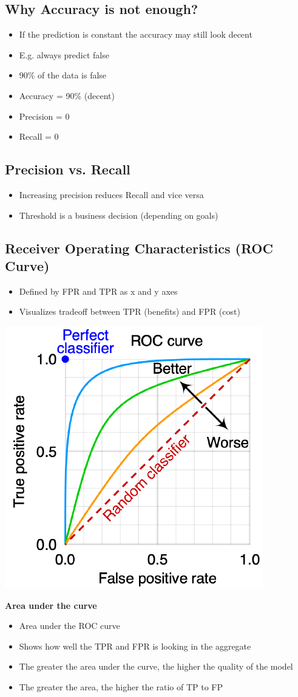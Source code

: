 \subsection{Why Accuracy is not enough?}
\begin{itemize}
    \item If the prediction is constant the accuracy may still look decent
    \item E.g. always predict false
    \item 90\% of the data is false
    \item Accuracy = 90\% (decent)
    \item Precision = 0
    \item Recall = 0
\end{itemize}

\subsection{Precision vs. Recall}
\begin{itemize}
    \item Increasing precision reduces Recall and vice versa
    \item Threshold is a business decision (depending on goals)
\end{itemize}

\subsection{Receiver Operating Characteristics (ROC Curve)}
\begin{itemize}
    \item Defined by FPR and TPR as x and y axes
    \item Visualizes tradeoff between TPR (benefits) and FPR (cost)
\end{itemize}
\begin{center}
    \includegraphics[width=0.4\linewidth]{./img/roc.png}
\end{center}
\textbf{Area under the curve}
\begin{itemize}
    \item Area under the ROC curve
    \item Shows how well the TPR and FPR is looking in the aggregate
    \item The greater the area under the curve, the higher the quality of the model
    \item The greater the area, the higher the ratio of TP to FP
\end{itemize}

